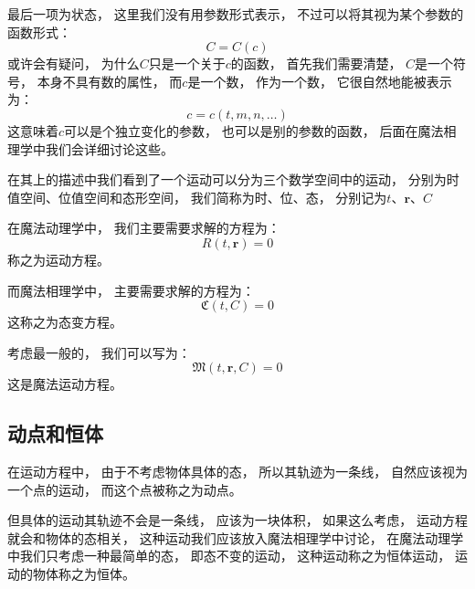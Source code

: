\documentclass[UTF8,12pt]{ctexart}
\begin{document}
            最后一项为状态，
            这里我们没有用参数形式表示，
            不过可以将其视为某个参数的函数形式：
            \begin{equation}
                C=C(c)
            \end{equation}
            或许会有疑问，
            为什么$C$只是一个关于$c$的函数，
            首先我们需要清楚，
            $C$是一个符号，
            本身不具有数的属性，
            而$c$是一个数，
            作为一个数，
            它很自然地能被表示为：
            \begin{equation}
                c=c(t,m,n,\dots)
            \end{equation}
            这意味着$c$可以是个独立变化的参数，
            也可以是别的参数的函数，
            后面在魔法相理学中我们会详细讨论这些。

            在其上的描述中我们看到了一个运动可以分为三个数学空间中的运动，
            分别为时值空间、位值空间和态形空间，
            我们简称为时、位、态，
            分别记为$t$、$\textbf{r}$、$C$

            在魔法动理学中，
            我们主要需要求解的方程为：
            \begin{equation}
                R(t,\textbf{r})=0
            \end{equation}
            称之为运动方程。

            而魔法相理学中，
            主要需要求解的方程为：
            \begin{equation}
                \mathfrak{C} (t,C)=0
            \end{equation}
            这称之为态变方程。

            考虑最一般的，
            我们可以写为：
            \begin{equation}
                \mathfrak{M}(t,\textbf{r},C)=0
            \end{equation}
            这是魔法运动方程。
        \subsection{动点和恒体}
            在运动方程中，
            由于不考虑物体具体的态，
            所以其轨迹为一条线，
            自然应该视为一个点的运动，
            而这个点被称之为动点。

            但具体的运动其轨迹不会是一条线，
            应该为一块体积，
            如果这么考虑，
            运动方程就会和物体的态相关，
            这种运动我们应该放入魔法相理学中讨论，
            在魔法动理学中我们只考虑一种最简单的态，
            即态不变的运动，
            这种运动称之为恒体运动，
            运动的物体称之为恒体。
\end{document}
